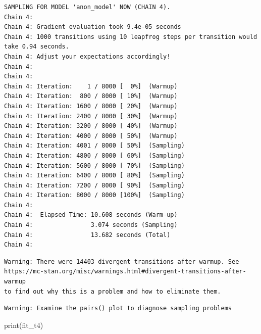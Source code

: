 \documentclass[
  10pt,
]{article}
\newenvironment{Shaded}{\begin{snugshade}}{\end{snugshade}}
\newcommand{\FunctionTok}[1]{\textcolor[rgb]{0.28,0.35,0.67}{#1}}
\newcommand{\NormalTok}[1]{\textcolor[rgb]{0.00,0.23,0.31}{#1}}
\begin{document}
\begin{verbatim}
SAMPLING FOR MODEL 'anon_model' NOW (CHAIN 4).
Chain 4: 
Chain 4: Gradient evaluation took 9.4e-05 seconds
Chain 4: 1000 transitions using 10 leapfrog steps per transition would take 0.94 seconds.
Chain 4: Adjust your expectations accordingly!
Chain 4: 
Chain 4: 
Chain 4: Iteration:    1 / 8000 [  0%]  (Warmup)
Chain 4: Iteration:  800 / 8000 [ 10%]  (Warmup)
Chain 4: Iteration: 1600 / 8000 [ 20%]  (Warmup)
Chain 4: Iteration: 2400 / 8000 [ 30%]  (Warmup)
Chain 4: Iteration: 3200 / 8000 [ 40%]  (Warmup)
Chain 4: Iteration: 4000 / 8000 [ 50%]  (Warmup)
Chain 4: Iteration: 4001 / 8000 [ 50%]  (Sampling)
Chain 4: Iteration: 4800 / 8000 [ 60%]  (Sampling)
Chain 4: Iteration: 5600 / 8000 [ 70%]  (Sampling)
Chain 4: Iteration: 6400 / 8000 [ 80%]  (Sampling)
Chain 4: Iteration: 7200 / 8000 [ 90%]  (Sampling)
Chain 4: Iteration: 8000 / 8000 [100%]  (Sampling)
Chain 4: 
Chain 4:  Elapsed Time: 10.608 seconds (Warm-up)
Chain 4:                3.074 seconds (Sampling)
Chain 4:                13.682 seconds (Total)
Chain 4: 
\end{verbatim}

\begin{verbatim}
Warning: There were 14403 divergent transitions after warmup. See
https://mc-stan.org/misc/warnings.html#divergent-transitions-after-warmup
to find out why this is a problem and how to eliminate them.
\end{verbatim}

\begin{verbatim}
Warning: Examine the pairs() plot to diagnose sampling problems
\end{verbatim}

\begin{Shaded}
\begin{Highlighting}[]
\FunctionTok{print}\NormalTok{(fit\_t4)}
\end{Highlighting}
\end{Shaded}
\end{document}
